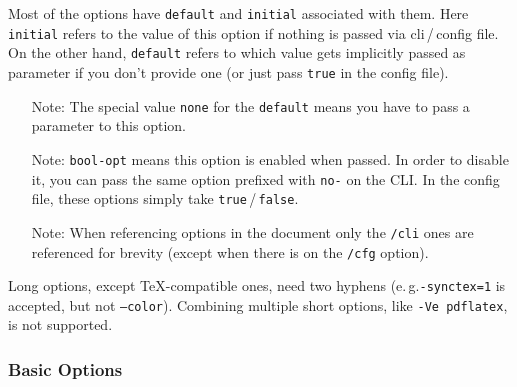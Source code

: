 \documentclass[a4paper, 11pt]{scrartcl}
\newcommand\eg{e.\,g.\xspace}
\let\TeXold\TeX
\renewcommand\TeX{\TeXold\xspace}
\begin{document}
Most of the options have \texttt{default} and \texttt{initial} associated with them.
Here \texttt{initial} refers to the value of this option if nothing is passed via cli\,/\,config file.
On the other hand, \texttt{default} refers to which value gets implicitly passed as parameter if you don't provide one (or just pass \texttt{true} in the config file).

\begin{itemize}
	\item[Note:] The special value \texttt{none} for the \texttt{default} means you have to pass a parameter to this option.
	\item[Note:] \texttt{bool-opt} means this option is enabled when passed.
		In order to disable it, you can pass the same option prefixed with \texttt{no-} on the CLI.
		In the config file, these options simply take \texttt{true}\,/\,\texttt{false}.
	\item[Note:] When referencing options in the document only the \texttt{/cli} ones are referenced for brevity (except when there is on the \texttt{/cfg} option).
\end{itemize}

Long options, except \TeX-compatible ones, need two hyphens (\eg \texttt{-synctex=1} is accepted, but not \texttt{--color}).
Combining multiple short options, like \texttt{-Ve pdflatex}, is not supported.

\subsubsection{Basic Options}
\end{document}

